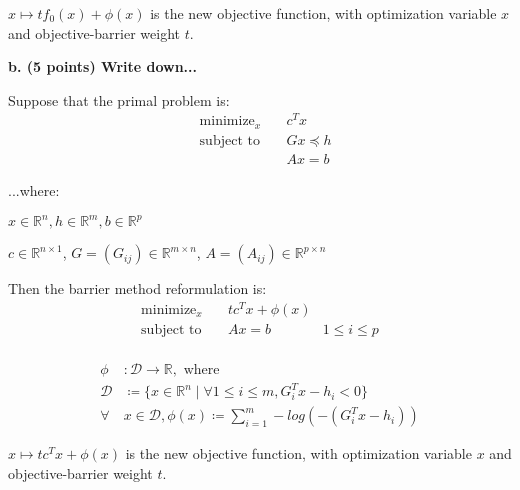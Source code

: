 \documentclass[a4paper,10pt]{article}
\theoremstyle{definition}
\begin{document}
$x \mapsto tf_0(x) + \phi(x)$ is the new objective function,
with optimization variable $x$ and objective-barrier weight $t$.

\textbf{b. (5 points) Write down...}


Suppose that the primal problem is:
\[
\begin{aligned}
    & \text{minimize}_{x} \quad & c^Tx \\
    & \text{subject to} \quad & Gx \preceq h \\
    & \quad & Ax = b  
\end{aligned}
\]

...where:

$x \in \mathbb{R}^n, h \in \mathbb{R}^m, b \in \mathbb{R}^p$

$c \in \mathbb{R}^{n \times 1}$, $G = (G_{ij}) \in \mathbb{R}^{m \times n}$, $A = (A_{ij}) \in \mathbb{R}^{p \times n}$

Then the barrier method reformulation is: 
\[
\begin{aligned}
    \text{minimize}_{x} \quad & tc^Tx + \phi(x)\\
    \text{subject to} \quad & Ax = b \quad & 1 \leq i \leq p\\
\end{aligned}
\]

\[
\begin{aligned}
    \phi & : \mathcal{D} \rightarrow \mathbb{R}, \text{ where }\\
    \mathcal{D} & \coloneq \{x \in \mathbb{R} ^ n \mid \forall 1\leq i\leq m, G_i^Tx - h_i < 0\}\\
    \forall & x \in \mathcal{D}, \phi(x) \coloneq \sum_{i=1}^{m} -log(-(G_i^Tx - h_i))
\end{aligned}
\]

$x \mapsto tc^Tx + \phi(x)$ is the new objective function,
with optimization variable $x$ and objective-barrier weight $t$.
\end{document}
